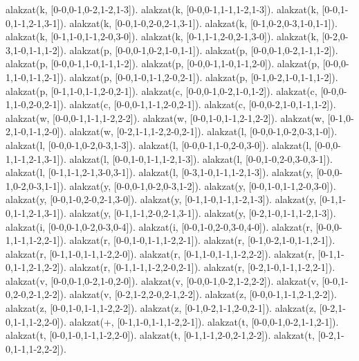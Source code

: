 \begin{program}
alakzat(k, [0-0,0-1,0-2,1-2,1-3]).
alakzat(k, [0-0,0-1,1-1,1-2,1-3]).
alakzat(k, [0-0,1-0,1-1,2-1,3-1]).
alakzat(k, [0-0,1-0,2-0,2-1,3-1]).
alakzat(k, [0-1,0-2,0-3,1-0,1-1]).
alakzat(k, [0-1,1-0,1-1,2-0,3-0]).
alakzat(k, [0-1,1-1,2-0,2-1,3-0]).
alakzat(k, [0-2,0-3,1-0,1-1,1-2]).
alakzat(p, [0-0,0-1,0-2,1-0,1-1]).
alakzat(p, [0-0,0-1,0-2,1-1,1-2]).
alakzat(p, [0-0,0-1,1-0,1-1,1-2]).
alakzat(p, [0-0,0-1,1-0,1-1,2-0]).
alakzat(p, [0-0,0-1,1-0,1-1,2-1]).
alakzat(p, [0-0,1-0,1-1,2-0,2-1]).
alakzat(p, [0-1,0-2,1-0,1-1,1-2]).
alakzat(p, [0-1,1-0,1-1,2-0,2-1]).
alakzat(c, [0-0,0-1,0-2,1-0,1-2]).
alakzat(c, [0-0,0-1,1-0,2-0,2-1]).
alakzat(c, [0-0,0-1,1-1,2-0,2-1]).
alakzat(c, [0-0,0-2,1-0,1-1,1-2]).
alakzat(w, [0-0,0-1,1-1,1-2,2-2]).
alakzat(w, [0-0,1-0,1-1,2-1,2-2]).
alakzat(w, [0-1,0-2,1-0,1-1,2-0]).
alakzat(w, [0-2,1-1,1-2,2-0,2-1]).
alakzat(l, [0-0,0-1,0-2,0-3,1-0]).
alakzat(l, [0-0,0-1,0-2,0-3,1-3]).
alakzat(l, [0-0,0-1,1-0,2-0,3-0]).
alakzat(l, [0-0,0-1,1-1,2-1,3-1]).
alakzat(l, [0-0,1-0,1-1,1-2,1-3]).
alakzat(l, [0-0,1-0,2-0,3-0,3-1]).
alakzat(l, [0-1,1-1,2-1,3-0,3-1]).
alakzat(l, [0-3,1-0,1-1,1-2,1-3]).
alakzat(y, [0-0,0-1,0-2,0-3,1-1]).
alakzat(y, [0-0,0-1,0-2,0-3,1-2]).
alakzat(y, [0-0,1-0,1-1,2-0,3-0]).
alakzat(y, [0-0,1-0,2-0,2-1,3-0]).
alakzat(y, [0-1,1-0,1-1,1-2,1-3]).
alakzat(y, [0-1,1-0,1-1,2-1,3-1]).
alakzat(y, [0-1,1-1,2-0,2-1,3-1]).
alakzat(y, [0-2,1-0,1-1,1-2,1-3]).
alakzat(i, [0-0,0-1,0-2,0-3,0-4]).
alakzat(i, [0-0,1-0,2-0,3-0,4-0]).
alakzat(r, [0-0,0-1,1-1,1-2,2-1]).
alakzat(r, [0-0,1-0,1-1,1-2,2-1]).
alakzat(r, [0-1,0-2,1-0,1-1,2-1]).
alakzat(r, [0-1,1-0,1-1,1-2,2-0]).
alakzat(r, [0-1,1-0,1-1,1-2,2-2]).
alakzat(r, [0-1,1-0,1-1,2-1,2-2]).
alakzat(r, [0-1,1-1,1-2,2-0,2-1]).
alakzat(r, [0-2,1-0,1-1,1-2,2-1]).
alakzat(v, [0-0,0-1,0-2,1-0,2-0]).
alakzat(v, [0-0,0-1,0-2,1-2,2-2]).
alakzat(v, [0-0,1-0,2-0,2-1,2-2]).
alakzat(v, [0-2,1-2,2-0,2-1,2-2]).
alakzat(z, [0-0,0-1,1-1,2-1,2-2]).
alakzat(z, [0-0,1-0,1-1,1-2,2-2]).
alakzat(z, [0-1,0-2,1-1,2-0,2-1]).
alakzat(z, [0-2,1-0,1-1,1-2,2-0]).
alakzat(+, [0-1,1-0,1-1,1-2,2-1]).
alakzat(t, [0-0,0-1,0-2,1-1,2-1]).
alakzat(t, [0-0,1-0,1-1,1-2,2-0]).
alakzat(t, [0-1,1-1,2-0,2-1,2-2]).
alakzat(t, [0-2,1-0,1-1,1-2,2-2]).
\end{program}
